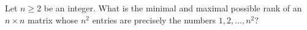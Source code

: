 Let \( n\ge 2\) be an integer. What is the minimal and maximal possible rank of an \( n\times n\) matrix whose \( n^{2}\) entries are precisely the numbers \( 1, 2, \ldots, n^{2}\)?